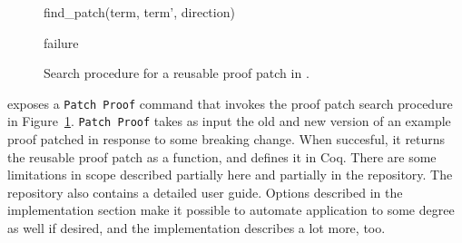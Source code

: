 \begin{figure}
\begin{algorithmic}
\renewcommand{\thealgorithm}{}
\footnotesize
\caption{\footnotesize{find\_patch(term, term', direction)}}
    \STATE {}
    \STATE {}
      \STATE {}
    \ENDIF
    \RETURN failure
\end{algorithmic}
\caption{Search procedure for a reusable proof patch in \sysname.}
\label{alg:patching}	
\end{figure}

\sysname exposes a \lstinline{Patch Proof} command that invokes the proof patch search procedure in Figure~\ref{alg:patching}.
\lstinline{Patch Proof} takes as input the old and new version of an example proof patched in response to some breaking change.
When succesful, it returns the reusable proof patch as a function, and defines it in Coq.
There are some limitations in scope described partially here and partially in the repository.
The \sysname repository also contains a detailed user guide.
Options described in the implementation section make it possible to automate application to some degree as well if desired,
and the implementation describes a lot more, too.


